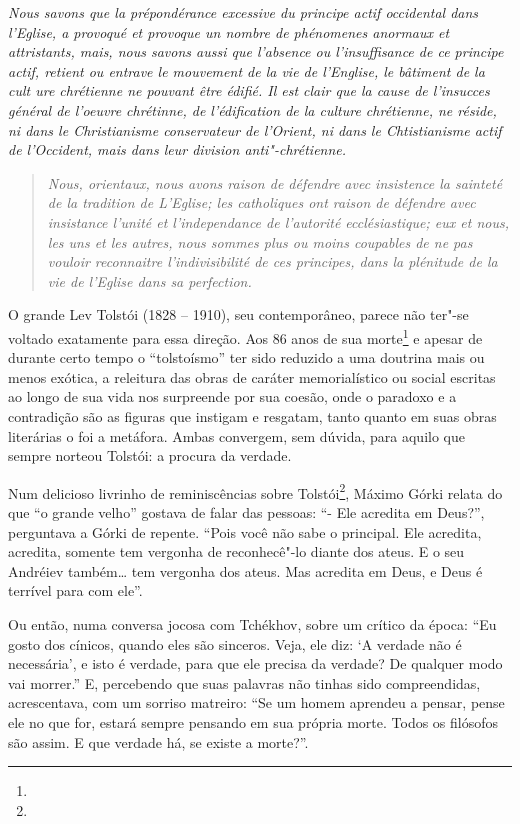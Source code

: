 \emph{Nous savons que la prépondérance excessive du principe actif
occidental dans l'Eglise, a provoqué et provoque un nombre de phénomenes
anormaux et attristants, mais, nous savons aussi que l'absence ou
l'insuffisance de ce principe actif, retient ou entrave le mouvement de
la vie de l'Englise, le bâtiment de la cult ure chrétienne ne pouvant
être édifié. Il est clair que la cause de l'insucces général de l'oeuvre
chrétinne, de l'édification de la culture chrétienne, ne réside, ni dans
le Christianisme conservateur de l'Orient, ni dans le Chtistianisme
actif de l'Occident, mais dans leur division anti"-chrétienne.}

\begin{quote}
\emph{Nous, orientaux, nous avons raison de défendre avec insistence la
sainteté de la tradition de L'Eglise; les catholiques ont raison de
défendre avec insistance l'unité et l'independance de l'autorité
ecclésiastique; eux et nous, les uns et les autres, nous sommes plus ou
moins coupables de ne pas vouloir reconnaitre l'indivisibilité de ces
principes, dans la plénitude de la vie de l'Eglise dans sa perfection.}
\end{quote}

O grande Lev Tolstói (1828 -- 1910), seu contemporâneo, parece não
ter"-se voltado exatamente para essa direção. Aos 86 anos de sua
morte\footnote{} e apesar de durante certo tempo o ``tolstoísmo'' ter
sido reduzido a uma doutrina mais ou menos exótica, a releitura das
obras de caráter memorialístico ou social escritas ao longo de sua vida
nos surpreende por sua coesão, onde o paradoxo e a contradição são as
figuras que instigam e resgatam, tanto quanto em suas obras literárias o
foi a metáfora. Ambas convergem, sem dúvida, para aquilo que sempre
norteou Tolstói: a procura da verdade.

Num delicioso livrinho de reminiscências sobre Tolstói\footnote{},
Máximo Górki relata do que ``o grande velho'' gostava de falar das
pessoas: ``- Ele acredita em Deus?'', perguntava a Górki de repente.
``Pois você não sabe o principal. Ele acredita, acredita, somente tem
vergonha de reconhecê"-lo diante dos ateus. E o seu Andréiev também\ldots{} tem vergonha dos ateus. Mas acredita em Deus, e Deus é terrível para com
ele''.

Ou então, numa conversa jocosa com Tchékhov, sobre um crítico da época:
``Eu gosto dos cínicos, quando eles são sinceros. Veja, ele diz: `A
verdade não é necessária', e isto é verdade, para que ele precisa da
verdade? De qualquer modo vai morrer.'' E, percebendo que suas palavras
não tinhas sido compreendidas, acrescentava, com um sorriso matreiro:
``Se um homem aprendeu a pensar, pense ele no que for, estará sempre
pensando em sua própria morte. Todos os filósofos são assim. E que
verdade há, se existe a morte?''.

